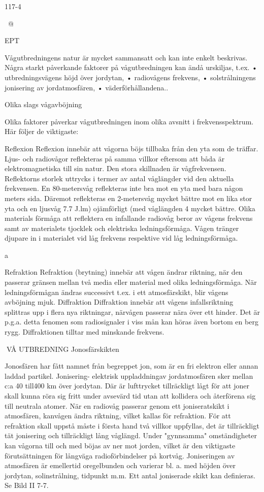 \documentclass[a4paper,twoside,twocolumn,openright]{book}
\begin{document}
{{{{{{117-4

~@~

EPT

Vågutbredningens natur är mycket sammansatt och kan inte enkelt beskrivas. Några starkt påverkande faktorer på vågutbredningen kan ändå urskiljas, t.ex.
• utbredningsvägens höjd över jordytan,
• radiovågens frekvens,
• solstrålningens jonisering av jordatmosfären,
• väderförhållandena..

Olika slags vågavböjning

Olika faktorer påverkar vågutbredningen
inom olika avsnitt i frekvensspektrum. Här
följer de viktigaste:

Reflexion
Reflexion innebär att vågorna böjs tillbaka
från den yta som de träffar. Ljus- och radiovågor reflekteras på samma villkor eftersom
att båda är elektromagnetiska till sin natur.
Den stora skillnaden är vågfrekvensen.
Reflektorns storlek uttrycks i termer av
antal våglängder vid den aktuella frekvensen. En 80-metersvåg reflekteras inte bra
mot en yta med bara någon meters sida.
Däremot reflekteras en 2-metersvåg mycket bättre mot en lika stor yta och en ljusvåg
7.7 J.lm) ojämförligt
(med våglängden 4
mycket bättre.
Olika materials förmåga att reflektera en
infallande radiovåg beror av vågens frekvens samt av materialets tjocklek och elektriska ledningsförmåga. Vågen tränger djupare in i materialet vid låg frekvens respektive vid låg ledningsförmåga.

a

Refraktion
Refraktion (brytning) innebär att vågen ändrar riktning, när den passerar gränsen mellan två media eller material med olika ledningsförmåga. När ledningsförmågan ändras successivt t.ex. i ett atmosfärskikt, blir
vågens avböjning mjuk.
Diffraktion
Diffraktion innebär att vågens infallsriktning
splittras upp i flera nya riktningar, närvågen
passerar nära över ett hinder. Det är p.g.a.
detta fenomen som radiosignaler i viss mån
kan höras även bortom en berg rygg. Diffraktionen tilltar med minskande frekvens.

VÅ UTBREDNING
Jonosfärskikten

Jonosfären har fått namnet från begreppet
jon, som är en fri elektron eller annan laddad
partikel. Jonisering- elektrisk uppladdningav jordatmosfären sker mellan c:a 40 till400
km över jordytan. Där är lufttrycket tillräckligt
lågt för att joner skall kunna röra sig fritt
under avsevärd tid utan att kollidera och
återförena sig till neutrala atomer.
När en radiovåg passerar genom ett
joniseratskikt i atmosfären, kanvågen ändra
riktning, vilket kallas för refraktion. För att
refraktion skall uppstå måste i första hand
två villkor uppfyllas, det är tillräckligt tät jonisering och tillräckligt lång våglängd. Under
"gynnsamma" omständigheter kan vågorna
till och med böjas av ner mot jorden, vilket är
den viktigaste förutsättningen för långväga
radioförbindelser på kortvåg.
Joniseringen av atmosfären är emellertid
oregelbunden och varierar bl. a. med höjden
över jordytan, solinstrålning, tidpunkt m.m.
Ett antal joniserade skikt kan definieras.
Se Bild II 7-7.

}}}}}}
\end{document}
